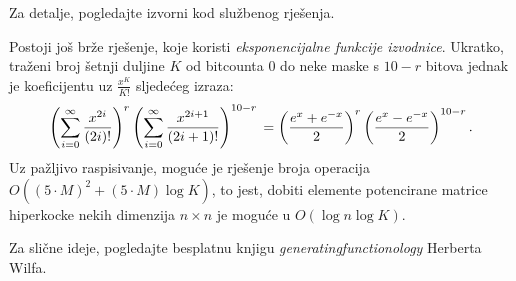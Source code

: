 Za detalje, pogledajte izvorni kod službenog rješenja.

Postoji još brže rješenje, koje koristi \textit{eksponencijalne funkcije
izvodnice}. Ukratko, traženi broj šetnji duljine $K$ od bitcounta $0$
do neke maske s $10-r$ bitova jednak je koeficijentu
uz $\frac{x^K}{K!}$ sljedećeg izraza:
\[
  \left(\sum_{i=0}^{\infty} \frac{x^{2i}}{(2i)!}\right)^{r}
  \left(\sum_{i=0}^{\infty} \frac{x^{2i+1}}{(2i+1)!}\right)^{10-r} \\
  = \left( \frac{e^x + e^{-x}}{2} \right)^{r}
  \left( \frac{e^x - e^{-x}}{2} \right)^{10-r}.
\]
Uz pažljivo raspisivanje, moguće je rješenje broja operacija
$O((5\cdot M)^2 + (5\cdot M) \log K)$, to jest, dobiti elemente
potencirane matrice hiperkocke
nekih dimenzija $n \times n$ je moguće u $O(\log n \log K)$.

Za slične ideje, pogledajte besplatnu knjigu
\textit{generatingfunctionology} Herberta Wilfa.
